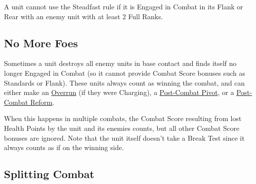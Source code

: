 A unit cannot use the Steadfast rule if it is Engaged in Combat in its Flank or Rear with an enemy unit with at least 2 Full Ranks.

\newcommand{\figSplitA}{a)}
\newcommand{\figSplitB}{b)}


\subsection{No More Foes}
\label{no_more_foes}

Sometimes a unit destroys all enemy units in base contact and finds itself no longer Engaged in Combat (so it cannot provide Combat Score bonuses such as Standards or Flank). These units always count as winning the combat, and can either make an \hyperref[overrun]{Overrun} (if they were Charging), a \hyperref[post_combat_pivot]{Post-Combat Pivot}, or a \hyperref[post_combat_reform]{Post-Combat Reform}.

When this happens in multiple combats, the Combat Score resulting from lost Health Points by the unit and its enemies counts, but all other Combat Score bonuses are ignored. Note that the unit itself doesn't take a Break Test since it always counts as if on the winning side.

\subsection{Splitting Combat}
\label{splitting_combat}

